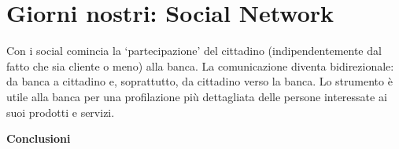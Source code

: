 \documentclass[aip, reprint]{article}
\begin{document}
\newpage
\section{Giorni nostri: Social Network}
Con i social comincia la ‘partecipazione’ del cittadino (indipendentemente dal fatto che sia cliente o meno) alla banca. La comunicazione diventa bidirezionale: da banca a cittadino e, soprattutto, da cittadino verso la banca.
Lo strumento è utile alla banca per una profilazione più dettagliata delle persone interessate ai suoi prodotti e servizi.



\newpage
\textbf{Conclusioni}\\
\end{document}
